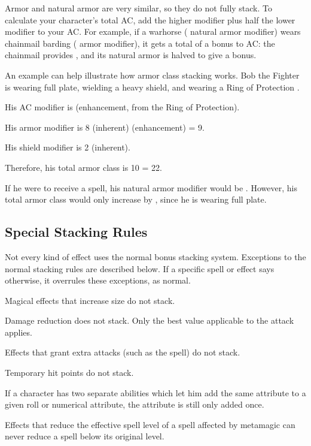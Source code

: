 Armor and natural armor are very similar, so they do not fully stack. To calculate your character's total AC, add the higher modifier plus half the lower modifier to your AC. For example, if a warhorse ( natural armor modifier) wears chainmail barding ( armor modifier), it gets a total of a  bonus to AC: the chainmail provides , and its natural armor is halved to give a  bonus.

An example can help illustrate how armor class stacking works. Bob the Fighter is wearing  full plate, wielding a heavy shield, and wearing a Ring of Protection . 
\begin{itemize*}
\item His AC modifier is  (enhancement, from the Ring of Protection).
\item His armor modifier is 8 (inherent)  (enhancement) = 9.
\item His shield modifier is 2 (inherent).
\item Therefore, his total armor class is 10    = 22.
\end{itemize*}

If he were to receive a  spell, his natural armor modifier would be . However, his total armor class would only increase by , since he is wearing full plate.

\subsection{Special Stacking Rules}
Not every kind of effect uses the normal bonus stacking system. Exceptions to the normal stacking rules are described below. If a specific spell or effect says otherwise, it overrules these exceptions, as normal.
\begin{itemize*}
\item Magical effects that increase size do not stack.
\item Damage reduction does not stack. Only the best value applicable to the attack applies.
\item Effects that grant extra attacks (such as the  spell) do not stack.
\item Temporary hit points do not stack.
\item If a character has two separate abilities which let him add the same attribute to a given roll or numerical attribute, the attribute is still only added once.
\item Effects that reduce the effective spell level of a spell affected by metamagic can never reduce a spell below its original level.
\end{itemize*}

